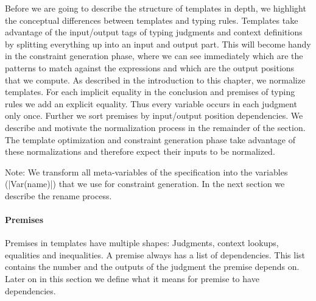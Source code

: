 Before we are going to describe the structure of templates in depth,
we highlight the conceptual differences between templates and typing
rules. Templates take advantage of the input/output tags of typing
judgments and context definitions by splitting everything up into an
input and output part. This will become handy in the constraint
generation phase, where we can see immediately which are the patterns
to match against the expressions and which are the output positions
that we compute. As described in the introduction to this chapter, we
normalize templates. For each implicit equality in the conclusion and
premises of typing rules we add an explicit equality. Thus every
variable occurs in each judgment only once. Further we sort premises
by input/output position dependencies. We describe and motivate the
normalization process in the remainder of the section. The template
optimization and constraint generation phase take advantage of these
normalizations and therefore expect their inputs to be normalized.

Note: We transform all meta-variables of the specification into the
variables (\code|Var(name)|) that we use for constraint generation. In
the next section we describe the rename process.

\paragraph*{Premises}
Premises in templates have multiple shapes: Judgments, context
lookups, equalities and inequalities. A premise always has a list of
dependencies. This list contains the number and the outputs of the
judgment the premise depends on. Later on in this section we define
what it means for premise to have dependencies.

